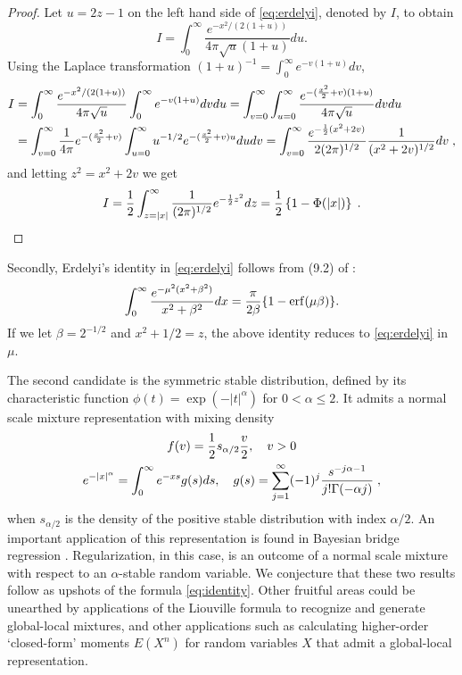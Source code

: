 \documentclass[lineno]{biometrika}
\begin{document}
\begin{proof}
Let $ u = 2z-1$ on the left hand side of \eqref{eq:erdelyi}, denoted by $I$, to obtain 
$$
I = \int_{0}^{\infty} \frac{e^{-x^2/(2(1+u))}}{4 \pi \sqrt{u} (1+u)} du.
$$
Using the Laplace transformation $(1+u)^{-1} = \int_0^{\infty} e^{-v(1+u)} dv$, 
\begin{align*}
  I &= \int_{0}^{\infty} \frac{e^{-x^2/(2(1+u))}}{4 \pi \sqrt{u}} 
  \int_0^{\infty} e^{-v(1+u)} dv du 
  = \int_{v= 0}^{\infty} \int_{u=0}^{\infty} 
  \frac{e^{-(\frac{x^2}{2} + v)(1+u)}}{4 \pi \sqrt{u}} dv du
  \\
  &= \int_{v= 0}^{\infty} \frac{1}{4\pi} e^{-(\frac{x^2}{2} + v)} 
  \int_{u=0}^{\infty} u^{-1/2} e^{-(\frac{x^2}{2} + v) u} du dv 
  = \int_{v= 0}^{\infty} \frac{ e^{-\frac{1}{2}(x^2 + 2v)}}{2 (2\pi)^{1/2}} 
  \frac{1}{(x^2+ 2v)^{1/2}} dv
  \;,
\end{align*}
and letting $z^2 = x^2 + 2v$ we get 
$$
I =\frac{1}{2}  \int_{z = |x|}^{\infty} \frac{1}{(2\pi)^{1/2}} e^{-\frac{1}{2} z^2} dz 
= \frac{1}{2} \left\{1 - \Phi(|x|)\right\}
\;.
$$
\end{proof}

Secondly, Erdelyi's identity in \eqref{eq:erdelyi} follows from (9.2) of
\cite{amdeberhan_cauchy-schlomilch_2010}: 
$$
\int_0^{\infty} \frac{e^{-\mu^2 (x^2 + \beta^2)}}{x^2+\beta^2} dx 
= \frac{\pi}{2 \beta} \{ 1 - {\rm erf}(\mu \beta) \}.
$$
If we let $\beta = 2^{-1/2}$ and $x^2+1/2 = z$, the above identity reduces to
\eqref{eq:erdelyi} in $\mu$. 

The second candidate is the symmetric stable distribution, defined by its
characteristic function $\phi(t) = \exp( -|t|^{\alpha})$ for $0 < \alpha \leq 2$.  
It admits a normal scale mixture representation with mixing density 
\begin{gather*}
  f(v) = \frac{1}{2} s_{\alpha/2} \frac{v}{2},\quad v > 0 
  \\
  e^{-|x|^\alpha} = \int_0^{\infty} e^{-xs} g(s) ds, \quad g(s) 
  = \sum_{j=1}^{\infty} (-1)^j \frac{s^{-j\alpha-1}}{j! \Gamma(-\alpha j)}
  \;,
\end{gather*}
when $s_{\alpha/2}$ is the density of the positive stable distribution with index 
$\alpha / 2$.  An important application of this representation is found in
Bayesian bridge regression \citep{polson_bayesian_2014}.  Regularization, in this
case, is an outcome of a normal scale mixture with respect to an
$\alpha$-stable random variable.  We conjecture that these two results follow
as upshots of the \CS{} formula \eqref{eq:identity}. Other fruitful areas could
be unearthed by applications of the Liouville formula to recognize and generate
global-local mixtures, and other applications such as calculating higher-order
`closed-form' moments $E(X^n)$ for random variables $X$ that admit a
global-local representation. 



\end{document}
